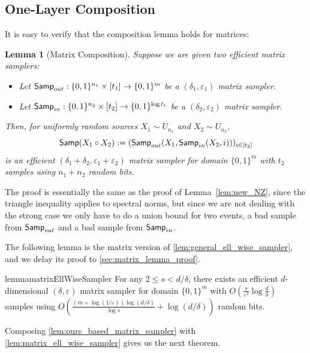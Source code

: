 \documentclass[10pt,a4paper]{article}
\newtheorem{lemma}[theorem]{Lemma}
\newcommand{\eps}{\varepsilon}
\newcommand{\1}{\mathbbm{1}}
\newcommand{\zo}{\{0, 1\}}
\newcommand{\Smp}{\textup{\textsf{Samp}}}
\begin{document}
\subsection{One-Layer Composition}
It is easy to verify that the composition lemma holds for matrices:
\begin{lemma}[Matrix  Composition]
\label{lem:matrix_composition}
    Suppose we are given two efficient matrix samplers:
\begin{itemize}
    \item  Let $\Smp_{out}: \zo^{n_1} \times [t_1] \to \zo^m$ be a $(\delta_1, \eps_1)$ matrix sampler.
    \item Let $\Smp_{in}: \zo^{n_2} \times [t_2] \to \zo^{\log t_1}$ be a $(\delta_2, \eps_2)$ matrix sampler.
\end{itemize}
 Then, for uniformly random sources $X_{1} \sim U_{n_1}$ and $X_{2} \sim U_{n_2}$, \[
        \Smp(X_1 \circ X_2):= (\Smp_{out}(X_1, \Smp_{in}(X_2, i)))_{i \in [t_2]}
    \]
    is an efficient $(\delta_1 + \delta_2, \eps_1 + \eps_2)$ matrix sampler for domain $\zo^m$ with $t_2$ samples using $n_1 + n_2$ random bits. 
\end{lemma}

The proof is essentially the same as the proof of Lemma~\ref{lem:new_NZ}, since the triangle inequality applies to spectral norms, but since we are not dealing with the strong case we only have to do a union bound for two events, a bad sample from $\Smp_{out}$ and a bad sample from $\Smp_{in}$.

The following lemma is the matrix version of \cref{lem:general_ell_wise_sampler}, and we delay its proof to \cref{sec:matrix_lemma_proof}.

\begin{restatable}{lemma}{matrixEllWiseSampler}
\label{lem:matrix_ell_wise_sampler}
    For any $2 \le s < d / \delta$, there exists an efficient $d$-dimensional $(\delta, \eps)$ matrix sampler for domain $\zo^m$ with $O(\frac{s}{\eps^{2}}\log \frac{d}{\delta})$ samples using 
    $O(\frac{(m + \log(1/\eps)) \log (d / \delta)}{\log s} + \log (d / \delta))$
    random bits.    
\end{restatable}
Composing \cref{lem:ours_based_matrix_sampler} with \cref{lem:matrix_ell_wise_sampler} gives us the next theorem.
\end{document}

